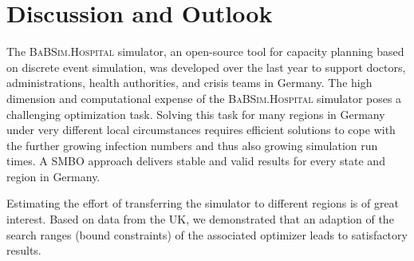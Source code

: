 \documentclass[conference]{IEEEtran}
\newcommand{\babsimhospital}{\textsc{BaBSim.Hospital}\xspace}
\begin{document}
\section{Discussion and Outlook}\label{sec:discussion}
The \babsimhospital simulator, an open-source tool for capacity planning based on discrete event simulation,  was developed over the last year to support doctors, administrations, health authorities, and crisis teams in Germany.
The high dimension and computational expense of the \babsimhospital simulator 
poses a challenging optimization task. 
Solving this task for many regions in Germany under very different local circumstances requires 
efficient solutions to cope with the further growing infection numbers and thus also growing simulation run times. 
A \gls{SMBO} approach delivers stable and valid results for every state and region in Germany.

Estimating the effort of transferring the simulator to different regions is of great interest. 
Based on data from the UK, we demonstrated that an adaption of the search ranges (bound constraints) of the associated optimizer leads to satisfactory results. 
\end{document}
